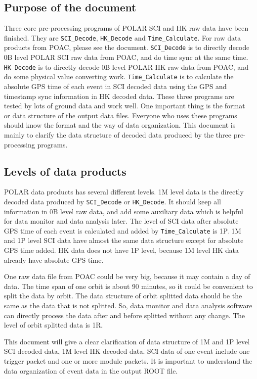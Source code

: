 \documentclass[a4paper, 12pt, onecolumn]{article}
\begin{document}
\subsection{Purpose of the document}
Three core pre-processing programs of POLAR SCI and HK raw data have been finished. 
They are \texttt{SCI\_Decode}, \texttt{HK\_Decode} and \texttt{Time\_Calculate}.
For raw data products from POAC, please see the document\cite{POAC-data-products}.
\texttt{SCI\_Decode} is to directly decode 0B level POLAR SCI raw data from POAC, and do time sync at the same time. 
\texttt{HK\_Decode} is to directly decode 0B level POLAR HK raw data from POAC, and do some physical value converting work.
\texttt{Time\_Calculate} is to calculate the absolute GPS time of each event in SCI decoded data using the GPS and timestamp sync information in HK decoded data.
These three programs are tested by lots of ground data and work well. One important thing is the format or data structure of the output data files.
Everyone who uses these programs should know the format and the way of data organization.
This document is mainly to clarify the data structure of decoded data produced by the three pre-processing programs.

\subsection{Levels of data products}
POLAR data products has several different levels. 1M level data is the directly decoded data produced by \texttt{SCI\_Decode} or \texttt{HK\_Decode}.
It should keep all information in 0B level raw data, and add some auxiliary data which is helpful for data monitor and data analysis later. 
The level of SCI data after absolute GPS time of each event is calculated and added by \texttt{Time\_Calculate} is 1P.
1M and 1P level SCI data have almost the same data structure except for absolute GPS time added.
HK data does not have 1P level, because 1M level HK data already have absolute GPS time.

One raw data file from POAC could be very big, because it may contain a day of data.
The time span of one orbit is about 90 minutes, so it could be convenient to split the data by orbit.
The data structure of orbit splitted data should be the same as the data that is not splitted.
So, data monitor and data analysis software can directly process the data after and before splitted without any change.
The level of orbit splitted data is 1R.

This document will give a clear clarification of data structure of 1M and 1P level SCI decoded data, 1M level HK decoded data.
SCI data of one event include one trigger packet and one or more module packets.
It is important to understand the data organization of event data in the output ROOT file.
\end{document}
